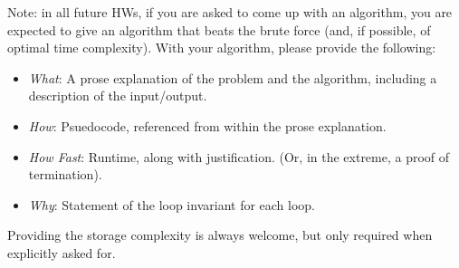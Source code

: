 \documentclass{article}
\begin{document}
Note: in all future HWs, if you are asked to come up with an algorithm, you are
expected to give an algorithm that beats the brute force (and, if possible, of
optimal time complexity). With your algorithm, please provide the following:
\begin{itemize}
    \item \emph{What}: A prose explanation of the problem and the algorithm,
        including a description of the input/output.
    \item \emph{How}: Psuedocode, referenced from within the prose explanation.
    \item \emph{How Fast}: Runtime, along with justification.  (Or, in the
        extreme, a proof of termination).
    \item \emph{Why}: Statement of the loop invariant for each loop.
\end{itemize}
Providing the storage complexity is always welcome, but only required when
explicitly asked for.
\end{document}
